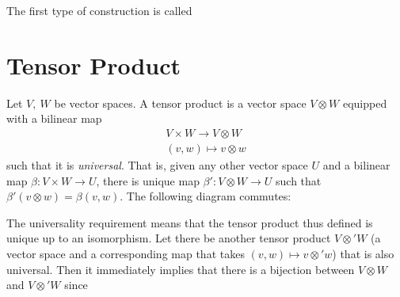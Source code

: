 The first type of construction is called 






\appendix
\chapter{Tensor Product}
\label{cha:tensor_product}

Let $V,\ W$ be vector spaces. A tensor product is a vector space $V\otimes W$ equipped with a bilinear map
\begin{align}
    V\times W \to V\otimes W\\
    (v,w) \mapsto v\otimes w
\end{align}
such that it is \emph{universal}. That is, given any other vector space $U$ and a bilinear map $\beta: V\times W\to U$, there is unique map $\beta': V\otimes W \to U$ such that $\beta'(v\otimes w) = \beta(v,w)$. The following diagram commutes:

\begin{center}
\end{center}
The universality requirement means that the tensor product thus defined is unique up to an isomorphism. Let there be another tensor product $V\otimes' W$ (a vector space and a corresponding map that takes $(v,w)\mapsto v\otimes' w$) that is also universal. Then it immediately implies that there is a bijection between $V\otimes W$ and $V\otimes' W$ since
\begin{center}
\end{center}

